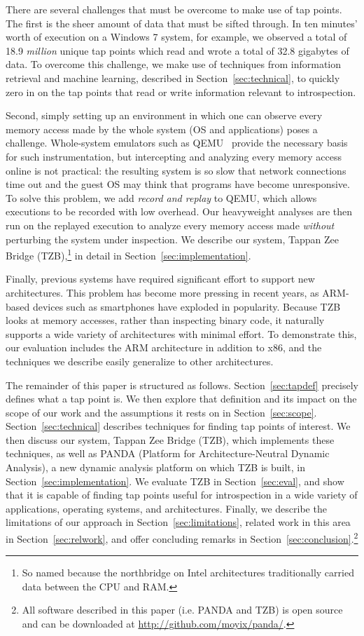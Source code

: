 There are several challenges that must be overcome to make use of tap
points. The first is the sheer amount of data that must be sifted
through. In ten minutes' worth of execution on a Windows 7 system, for
example, we observed a total of 18.9 \emph{million} unique tap points
which read and wrote a total of 32.8 gigabytes of data. To overcome this
challenge, we make use of techniques from information retrieval and
machine learning, described in Section~\ref{sec:technical}, to quickly
zero in on the tap points that read or write information relevant to
introspection.

Second, simply setting up an environment in which one can observe every
memory access made by the whole system (OS and applications) poses a
challenge. Whole-system emulators such as QEMU~\cite{Bellard:2005}
provide the necessary basis for such instrumentation, but intercepting
and analyzing every memory access online is not practical: the resulting
system is so slow that network connections time out and the guest OS may
think that programs have become unresponsive. To solve this problem, we
add \emph{record and replay} to QEMU, which allows executions to be
recorded with low overhead. Our heavyweight analyses are then run on
the replayed execution to analyze every memory access made
\emph{without} perturbing the system under inspection. We describe our
system, Tappan Zee Bridge (TZB),\footnote{So named because the
northbridge on Intel architectures traditionally carried data between
the CPU and RAM.} in detail in Section~\ref{sec:implementation}.

Finally, previous systems have required significant effort
to support new architectures. This problem has become more pressing in
recent years, as ARM-based devices such as smartphones have exploded in
popularity. Because TZB looks at memory accesses, rather than inspecting
binary code, it naturally supports a wide variety of architectures with
minimal effort. To demonstrate this, our evaluation includes the ARM
architecture in addition to x86, and the techniques we describe easily
generalize to other architectures.

The remainder of this paper is structured as follows.
Section~\ref{sec:tapdef} precisely defines what a tap point is. We then
explore that definition and its impact on the scope of our work and the
assumptions it rests on in Section~\ref{sec:scope}.
Section~\ref{sec:technical} describes techniques for finding tap points
of interest. We then discuss our system, Tappan Zee Bridge (TZB), which
implements these techniques, as well as PANDA (Platform for
Architecture-Neutral Dynamic Analysis), a new dynamic analysis platform
on which TZB is built, in Section~\ref{sec:implementation}. We evaluate
TZB in Section~\ref{sec:eval}, and show that it is capable of finding
tap points useful for introspection in a wide variety of applications,
operating systems, and architectures. Finally, we describe the
limitations of our approach in Section~\ref{sec:limitations}, related
work in this area in Section~\ref{sec:relwork}, and offer concluding
remarks in Section~\ref{sec:conclusion}.\footnote{All software described
in this paper (i.e. PANDA and TZB) is open source and can be downloaded
at \url{http://github.com/moyix/panda/}.}

\vfill\eject
